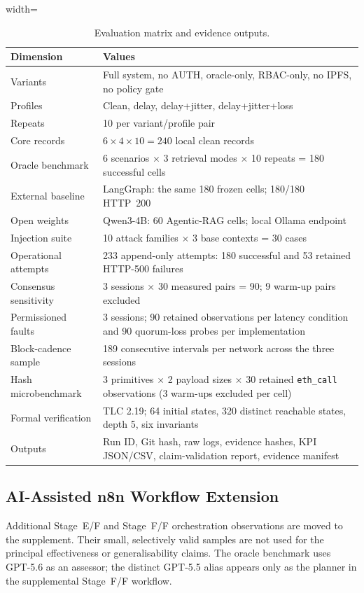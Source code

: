 \documentclass[journal]{IEEEtran}
\begin{document}
\begin{table}[!t]
\centering
\caption{Evaluation matrix and evidence outputs.}
\label{tab:eval-matrix}
\begin{adjustbox}{width=\columnwidth}
\begin{tabular}{p{2.6cm}p{5.6cm}}
\toprule
Dimension & Values \\
\midrule
Variants & Full system, no AUTH, oracle-only, RBAC-only, no IPFS, no policy gate \\
Profiles & Clean, delay, delay+jitter, delay+jitter+loss \\
Repeats & 10 per variant/profile pair \\
Core records & $6\times4\times10 = 240$ local clean records \\
Oracle benchmark & 6 scenarios $\times$ 3 retrieval modes $\times$ 10 repeats
= 180 successful cells \\
External baseline & LangGraph: the same 180 frozen cells; 180/180 HTTP~200 \\
Open weights & Qwen3-4B: 60 Agentic-RAG cells; local Ollama endpoint \\
Injection suite & 10 attack families $\times$ 3 base contexts = 30 cases \\
Operational attempts & 233 append-only attempts: 180 successful and 53
retained HTTP-500 failures \\
Consensus sensitivity & 3 sessions $\times$ 30 measured pairs = 90; 9 warm-up
pairs excluded \\
Permissioned faults & 3 sessions; 90 retained observations per latency
condition and 90 quorum-loss probes per implementation \\
Block-cadence sample & 189 consecutive intervals per network across the three
sessions \\
Hash microbenchmark & 3 primitives $\times$ 2 payload sizes $\times$ 30
retained \texttt{eth\_call} observations (3 warm-ups excluded per cell) \\
Formal verification & TLC 2.19; 64 initial states, 320 distinct reachable
states, depth 5, six invariants \\
Outputs & Run ID, Git hash, raw logs, evidence hashes, KPI JSON/CSV,
claim-validation report, evidence manifest \\
\bottomrule
\end{tabular}
\end{adjustbox}
\end{table}
\subsection{AI-Assisted n8n Workflow Extension}
\label{sec:n8n-extension}
Additional Stage~E/F and Stage~F/F orchestration observations are moved to the
supplement. Their small, selectively valid samples are not used for the
principal effectiveness or generalisability claims. The oracle benchmark uses
GPT-5.6 as an assessor; the distinct GPT-5.5 alias appears only as the planner
in the supplemental Stage~F/F workflow.
\end{document}

